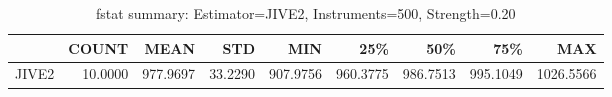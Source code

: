 \begin{table}[ht]
\centering
\caption{fstat summary: Estimator=JIVE2, Instruments=500, Strength=0.20}
\begin{tabular}{lrrrrrrrr}
\toprule
 & COUNT & MEAN & STD & MIN & 25\% & 50\% & 75\% & MAX \\
\midrule
JIVE2 & 10.0000 & 977.9697 & 33.2290 & 907.9756 & 960.3775 & 986.7513 & 995.1049 & 1026.5566 \\
\bottomrule
\end{tabular}
\end{table}
